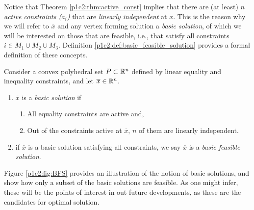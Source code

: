 Notice that Theorem \ref{p1c2:thm:active_const} implies that there are (at least) \emph{$n$ active constraints ($a_i$)} that are \emph{linearly independent} at $\overline{x}$. This is the reason why we will refer to $\overline{x}$ and any vertex forming solution a \emph{basic solution}, of which we will be interested on those that are feasible, i.e., that satisfy all constraints $i \in M_1 \cup M_2 \cup M_3$. Definition \ref{p1c2:def:basic_feasible_solution} provides a formal definition of these concepts.

\begin{definition} \label{p1c2:def:basic_feasible_solution}
	Consider a convex polyhedral set $P \subset \mathbb{R}^n$ defined by linear equality and inequality constraints, and let $\overline{x} \in \mathbb{R}^n$.
	\begin{enumerate}
		\item $\overline{x}$ is a \emph{basic solution} if 
		\begin{enumerate}
			\item All equality constraints are active and,
			\item Out of the constraints active at $\overline{x}$, $n$ of them are linearly independent.
		\end{enumerate}
		\item if $\overline{x}$  is a basic solution satisfying all constraints, we say $\overline{x}$ is a \emph{basic feasible solution}. 
	\end{enumerate}
\end{definition}

Figure \ref{p1c2:fig:BFS} provides an illustration of the notion of basic solutions, and show how only a subset of the basic solutions are feasible. As one might infer, these will be the points of interest in out future developments, as these are the candidates for optimal solution.

